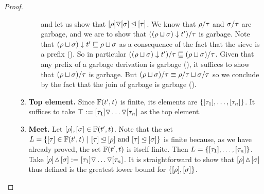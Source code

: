 \begin{proof}
\begin{enumerate}
\begin{enumerate}
\begin{enumerate}
      and let us show that $[\rho] \triangledown [\sigma] \unlhd [\tau]$.
      We know that $\rho/\tau$ and $\sigma/\tau$ are garbage,
      and we are to show that $((\rho \sqcup \sigma) \downarrow t')/\tau$
      is garbage.
      Note that $(\rho \sqcup \sigma) \downarrow t' \sqsubseteq \rho \sqcup \sigma$
      as a consequence of the fact that the sieve is a prefix ().
      So in particular $((\rho \sqcup \sigma) \downarrow t')/\tau \sqsubseteq (\rho \sqcup \sigma)/\tau$.
      Given that any prefix of a garbage derivation is garbage (),
      it suffices to show that $(\rho \sqcup \sigma)/\tau$ is garbage.
      But $(\rho \sqcup \sigma)/\tau \equiv \rho/\tau \sqcup \sigma/\tau$
      so we conclude by the fact that the join of garbage is garbage ().
    \end{enumerate}
  \item {\bf Top element.}
    Since $\mathbb{F}(t', t)$ is finite,
    its elements are $\{{[\tau_1]}, \hdots, {[\tau_n]}\}$.
    It suffices to take $\top := {[\tau_1]} \triangledown \hdots \triangledown {[\tau_n]}$
    as the top element.
  \item {\bf Meet.}
    Let ${[\rho]},{[\sigma]} \in \mathbb{F}(t', t)$.
    Note that the set $L = \{{[\tau]} \in \mathbb{F}(t', t) \ |\  {[\tau]} \unlhd {[\rho]} \text{ and } {[\tau]} \unlhd {[\sigma]}\}$
    is finite because, as we have already proved, the set $\mathbb{F}(t', t)$ is itself finite.
    Then $L = \{{[\tau_1]}, \hdots, {[\tau_n]}\}$.
    Take ${[\rho]} \!\vartriangle\! {[\sigma]} := {[\tau_1]} \triangledown \hdots \triangledown {[\tau_n]}$.
    It is straightforward to show that ${[\rho]} \!\vartriangle\! {[\sigma]}$
    thus defined is the greatest lower bound for $\{{[\rho]},{[\sigma]}\}$.
  \end{enumerate}


\end{enumerate}
\end{proof}
